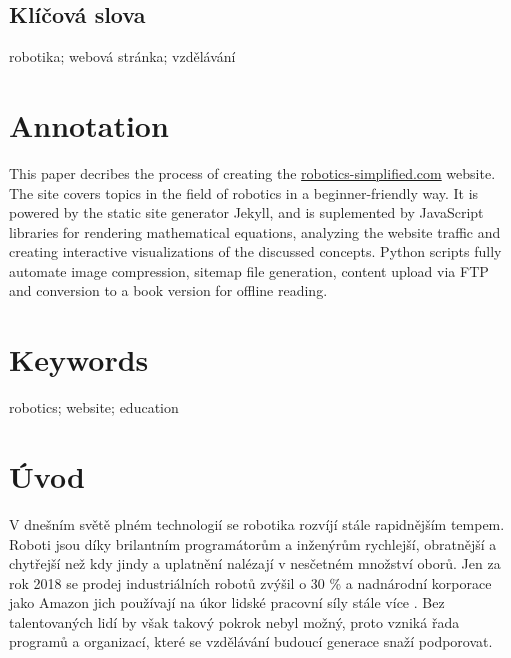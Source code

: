 \documentclass[a4paper, 12pt]{article}
\begin{document}
  \subsection*{\fontsize{18}{21.6}\selectfont\normalfont\textbf{Klíčová slova}}
  robotika; webová stránka; vzdělávání

  \section*{\normalfont\textbf{Annotation}}
  This paper decribes the process of creating the \url{robotics-simplified.com} website. The site covers topics in the field of robotics in a beginner-friendly way. It is powered by the static site generator Jekyll, and is suplemented by JavaScript libraries for rendering mathematical equations, analyzing the website traffic and creating interactive visualizations of the discussed concepts. Python scripts fully automate image compression, sitemap file generation, content upload via FTP and conversion to a book version for offline reading.

  \section*{\normalfont\textbf{Keywords}}
  robotics; website; education

  \newpage

  \setcounter{savepage}{\value{page}}%

  \renewcommand{\contentsname}{Obsah}
  \tableofcontents

  \newpage

  \section{Úvod}
  V dnešním světě plném technologií se robotika rozvíjí stále rapidnějším tempem. Roboti jsou díky brilantním programátorům a inženýrům rychlejší, obratnější a chytřejší než kdy jindy a uplatnění nalézají v nesčetném množství oborů. Jen za rok 2018 se prodej industriálních robotů zvýšil o 30 \% \cite{industrial-robot-growth} a nadnárodní korporace jako Amazon jich používají na úkor lidské pracovní síly stále více \cite{amazon-hiring}. Bez talentovaných lidí by však takový pokrok nebyl možný, proto vzniká řada programů a organizací, které se vzdělávání budoucí generace snaží podporovat.
\end{document}

